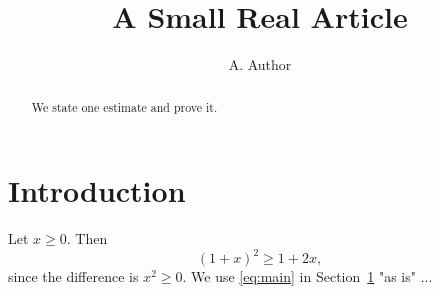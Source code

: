 \documentclass{article}
\title{A Small Real Article}
\author{A. Author}
\begin{document}
\maketitle
\begin{abstract}
We state one estimate and prove it.
\end{abstract}
\section{Introduction}\label{sec:intro}
Let $x \ge 0$. Then
\begin{equation}\label{eq:main}
  (1 + x)^2 \ge 1 + 2x ,
\end{equation}
since the difference is $x^2 \ge 0$. We use \eqref{eq:main} in
Section~\ref{sec:intro} "as is" ...
\end{document}
